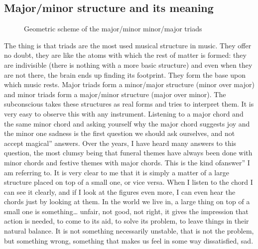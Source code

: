 \documentclass[]{report}
\begin{document}
\subsection{Major/minor structure and its meaning}
\begin{figure}[htbp]
\center%
\vspace{12pt}

\caption{Geometric scheme of the major/minor minor/major triads}\label{fig:maj-minor-scheme}
\end{figure}
The thing is that triads are the most used musical structure in music. They offer no doubt, they are like the atoms with which the rest of matter is formed: they are indivisible (there is nothing with a more basic structure) and even when they are not there, the brain ends up finding its footprint. They form the base upon which music rests.
Major triads form a minor/major structure (minor over major) and minor triads form a major/minor structure (major over minor). The subconscious takes these structures as real forms and tries to interpret them.
It is very easy to observe this with any instrument. Listening to a major chord and the same minor chord and asking yourself why the major chord suggests joy and the minor one sadness is the first question we should ask ourselves, and not accept magical'' answers. Over the years, I have heard many answers to this question, the most clumsy being that funeral themes have always been done with minor chords and festive themes with major chords. This is the kind ofanswer'' I am referring to.
It is very clear to me that it is simply a matter of a large structure placed on top of a small one, or vice versa. When I listen to the chord I can see it clearly, and if I look at the figures even more, I can even hear the chords just by looking at them. In the world we live in, a large thing on top of a small one is something\ldots{} unfair, not good, not right, it gives the impression that action is needed, to come to its aid, to solve its problem, to leave things in their natural balance. It is not something necessarily unstable, that is not the problem, but something wrong, something that makes us feel in some way dissatisfied, sad.
\end{document}
